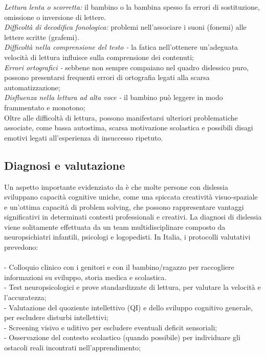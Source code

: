 \documentclass[14pt]{extbook}
\begin{document}
\noindent\textit{Lettura lenta o scorretta:} il bambino o la bambina spesso fa errori di sostituzione, omissione o inversione di lettere.\\
\textit{Difficoltà di decodifica fonologica:} problemi nell’associare i suoni (fonemi) alle lettere scritte (grafemi).\\
\textit{Difficoltà nella comprensione del testo -} la fatica nell’ottenere un’adeguata velocità di lettura influisce sulla comprensione dei contenuti;\\
\textit{Errori ortografici -} sebbene non sempre compaiano nel quadro dislessico puro, possono presentarsi frequenti errori di ortografia legati alla scarsa automatizzazione;\\
\textit{Disfluenza nella lettura ad alta voce -} il bambino può leggere in modo frammentato e monotono;\\

Oltre alle difficoltà di lettura, possono manifestarsi ulteriori problematiche associate, come bassa autostima, scarsa motivazione scolastica e possibili disagi emotivi legati all’esperienza di insuccesso ripetuto.

\subsection{Diagnosi e valutazione}
Un aspetto importante evidenziato da \cite{eide2011advantage} è che molte persone con dislessia sviluppano capacità cognitive uniche, come una spiccata creatività visuo-spaziale e un'ottima capacità di problem solving, che possono rappresentare vantaggi significativi in determinati contesti professionali e creativi. La diagnosi di dislessia viene solitamente effettuata da un team multidisciplinare composto da neuropsichiatri infantili, psicologi e logopedisti. In Italia, i protocolli valutativi prevedono:\\\\

\noindent- Colloquio clinico con i genitori e con il bambino/ragazzo per raccogliere informazioni su sviluppo, storia medica e scolastica.\\
- Test neuropsicologici e prove standardizzate di lettura, per valutare la velocità e l’accuratezza;\\
- Valutazione del quoziente intellettivo (QI) e dello sviluppo cognitivo generale, per escludere disturbi intellettivi;\\
- Screening visivo e uditivo per escludere eventuali deficit sensoriali;\\
- Osservazione del contesto scolastico (quando possibile) per individuare gli ostacoli reali incontrati nell’apprendimento;\\
\end{document}
